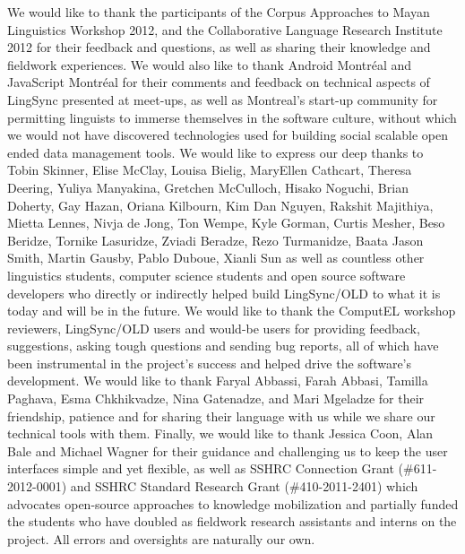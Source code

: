 \documentclass[11pt]{article}
\begin{document}
We would like to thank the participants of the Corpus Approaches to Mayan
Linguistics Workshop 2012, and the  Collaborative Language Research Institute
2012  for their feedback and questions, as well as sharing their knowledge and
fieldwork experiences. We would also like to thank Android Montr\'eal and
JavaScript Montr\'eal for their comments and feedback on technical aspects of
LingSync presented at meet-ups, as well as Montreal's start-up community for
permitting linguists to immerse themselves in the software culture, without
which we would not have discovered technologies  used for building social
scalable open ended data management tools.  We would like to express our deep
thanks to Tobin Skinner, Elise McClay, Louisa Bielig, MaryEllen Cathcart,
Theresa Deering, Yuliya Manyakina, Gretchen McCulloch, Hisako Noguchi, Brian
Doherty, Gay Hazan, Oriana Kilbourn, Kim Dan Nguyen, Rakshit Majithiya, Mietta
Lennes, Nivja de Jong, Ton Wempe, Kyle Gorman, Curtis Mesher, Beso Beridze,
Tornike Lasuridze, Zviadi Beradze, Rezo Turmanidze, Baata Jason Smith, Martin
Gausby, Pablo Duboue, Xianli Sun as well as countless other linguistics
students,  computer science students and open source software developers  who
directly or indirectly helped build LingSync/OLD to what it is today and will
be in the future.  We would like to thank the ComputEL workshop reviewers,
LingSync/OLD users and would-be users for providing feedback, suggestions, 
asking tough questions and sending bug reports, all of which have been
instrumental in the project's success and helped drive the software's
development.  We would like to thank Faryal Abbassi, Farah Abbasi, Tamilla
Paghava, Esma Chkhikvadze, Nina Gatenadze, and Mari Mgeladze for their
friendship, patience and for sharing their language with us while we share our 
technical tools with them.  Finally, we would like to thank Jessica Coon, Alan
Bale and Michael Wagner for their guidance and challenging us to keep the user
interfaces simple and yet flexible, as well as SSHRC Connection Grant
(\#611-2012-0001) and SSHRC Standard Research Grant (\#410-2011-2401) which
advocates open-source approaches to knowledge mobilization and partially funded
the students who have doubled as fieldwork research assistants and interns on
the project. All errors and oversights are naturally our own.  

\printglossary




\end{document}
